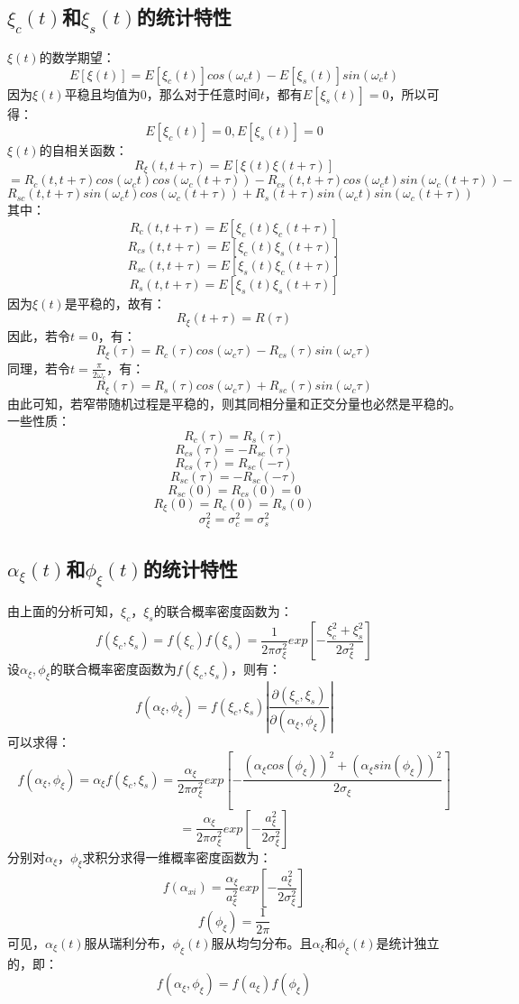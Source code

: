 \documentclass[12pt,a4paper,oneside]{ctexart}
\begin{document}
\subsection{$\xi_{c}(t)$和$\xi_{s}(t)$的统计特性}
$\xi(t)$的数学期望：
$$
    E\left[\xi(t)\right] = E\left[\xi_{c}(t)\right]cos(\omega_{c}t) - E\left[\xi_{s}(t)\right]sin(\omega_{c}t)
$$
因为$\xi(t)$平稳且均值为0，那么对于任意时间$t$，都有$E\left[\xi_{s}(t)\right] = 0$，所以可得：
$$
    E\left[\xi_{c}(t)\right] = 0,E\left[\xi_{s}(t)\right] = 0
$$
$\xi(t)$的自相关函数：
$$
    R_{\xi}(t,t + \tau) = E\left[\xi(t)\xi(t + \tau)\right]
$$
$$
     = R_{c}(t,t + \tau)cos(\omega_{c}t)cos(\omega_{c}(t + \tau))  - R_{cs}(t,t + \tau)cos(\omega_{c}t)sin(\omega_{c}(t + \tau)) - 
$$
$$
    R_{sc}(t,t + \tau)sin(\omega_{c}t)cos(\omega_{c}(t + \tau)) + R_{s}(t + \tau)sin(\omega_{c}t)sin(\omega_{c}(t + \tau))
$$
其中：
$$
    R_{c}(t,t + \tau) = E\left[\xi_{c}(t)\xi_{c}(t + \tau)\right]
$$
$$
    R_{cs}(t, t + \tau) = E\left[\xi_{c}(t)\xi_{s}(t + \tau)\right]
$$
$$
    R_{sc}(t, t + \tau) = E\left[\xi_{s}(t)\xi_{c}(t + \tau)\right]
$$
$$
    R_{s}(t, t + \tau) = E\left[\xi_{s}(t)\xi_{s}(t + \tau)\right]
$$
因为$\xi(t)$是平稳的，故有：
$$
    R_{\xi}(t + \tau) = R(\tau)
$$
因此，若令$t = 0$，有：
$$
    R_{\xi}(\tau)  = R_{c}(\tau)cos(\omega_{c}\tau) - R_{cs}(\tau)sin(\omega_{c}\tau)
$$
同理，若令$t = \frac{\pi}{2\omega_{c}}$，有：
$$
    R_{\xi}(\tau) = R_{s}(\tau)cos(\omega_{c}\tau) + R_{sc}(\tau)sin(\omega_{c}\tau)
$$
由此可知，若窄带随机过程是平稳的，则其同相分量和正交分量也必然是平稳的。\\
一些性质：
$$
    R_{c}(\tau) = R_{s}(\tau)
$$
$$
    R_{cs}(\tau) = -R_{sc}(\tau)
$$
$$
    R_{cs}(\tau) = R_{sc}(-\tau)
$$
$$
    R_{sc}(\tau) = -R_{sc}(-\tau)
$$
$$
    R_{sc}(0) = R_{cs}(0) = 0
$$
$$
    R_{\xi}(0) = R_{c}(0) = R_{s}(0)
$$
$$
    \sigma^{2}_{\xi} = \sigma^{2}_{c} = \sigma^{2}_{s}
$$
\subsection{$ \alpha_{\xi}(t)$和$ \phi_{\xi}(t)$的统计特性}
由上面的分析可知，$\xi_{c}$，$\xi_{s}$的联合概率密度函数为：
$$
    f(\xi_{c},\xi_{s}) = f(\xi_{c})f(\xi_{s}) = \frac{1}{2\pi\sigma^{2}_{\xi}}exp\left[-\frac{\xi^{2}_{c} + \xi^{2}_{s}}{2\sigma^{2}_{\xi}}\right]
$$
设$\alpha_{\xi},\phi_{\xi}$的联合概率密度函数为$f(\xi_{c},\xi_{s})$，则有：
$$
    f(\alpha_{\xi},\phi_{\xi}) = f(\xi_{c},\xi_{s})|\frac{\partial(\xi_{c},\xi_{s})}{\partial(\alpha_{\xi},\phi_{\xi})}|
$$
可以求得：
$$
    f(\alpha_{\xi},\phi_{\xi}) = \alpha_{\xi}f(\xi_{c},\xi_{s}) = \frac{\alpha_{\xi}}{2\pi\sigma^{2}_{\xi}}exp\left[-\frac{(\alpha_{\xi}cos(\phi_{\xi}))^{2} + (\alpha_{\xi}sin(\phi_{\xi}))^{2}}{2\sigma_{\xi}}\right]
$$
$$
     = \frac{\alpha_{\xi}}{2\pi\sigma^{2}_{\xi}}exp\left[-\frac{a^{2}_{\xi}}{2\sigma^{2}_{\xi}}\right]
$$
分别对$\alpha_{\xi}$，$\phi_{\xi}$求积分求得一维概率密度函数为：
$$
    f(\alpha_{xi}) = \frac{\alpha_{\xi}}{a^{2}_{\xi}}exp\left[-\frac{a^{2}_{\xi}}{2\sigma^{2}_{\xi}}\right]
$$
$$
    f(\phi_{\xi}) = \frac{1}{2\pi}
$$
可见，$\alpha_{\xi}(t)$服从瑞利分布，$\phi_{\xi}(t)$服从均匀分布。且$\alpha_{\xi}$和$\phi_{\xi}(t)$是统计独立的，即：
$$
    f(\alpha_{\xi},\phi_{\xi}) = f(a_{\xi})f(\phi_{\xi})
$$
\end{document}
